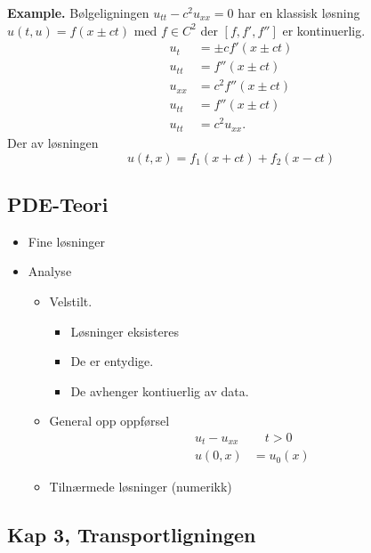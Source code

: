 \documentclass{article}
\theoremstyle{remark}
\begin{document}
  \textbf{Example.} 
    Bølgeligningen $u_{tt} - c^2 u_{x x} = 0$ har en klassisk løsning $u\left( t,u \right) = f\left( x \pm ct \right)$ med $f \in C^2 $  der $\left[ f, f', f''  \right]$ er kontinuerlig. 
    \begin{align*}
      u_{t} &=  \pm c f'\left( x \pm ct \right) \\
      u_{t t} &=  f''\left( x \pm ct \right) \\
      u_{x x} &=  c^2 f''\left( x \pm ct \right) \\
      u_{t t} &=  f'' \left( x \pm ct \right) \\
      u_{tt} &=  c^2 u_{x x}     
    .\end{align*}
    Der av løsningen \[
    u\left( t,x \right) = f_{1}\left( x + ct \right) + f_{2}\left( x -ct \right)
    \] 


  \subsection{PDE-Teori}%
  \label{sub:pde_teori}

  \begin{itemize}
    \item  Fine løsninger
    \item Analyse  
      \begin{itemize}
        \item Velstilt.
          \begin{itemize}
            \item Løsninger eksisteres
            \item De er entydige.
            \item De avhenger kontiuerlig av data. 
          \end{itemize}
        \item General opp oppførsel
          \[
            \begin{split}
          u_{t} - u_{x x}  &  \quad  t > 0 \\
          u\left( 0,x \right) &= u_{0} \left( x \right)
            \end{split}
          \] 
        \item Tilnærmede løsninger (numerikk)
      \end{itemize}

  \end{itemize}


  \subsection{Kap 3, Transportligningen}%
  \label{sub:kap_3_transportligningen}
\end{document}
